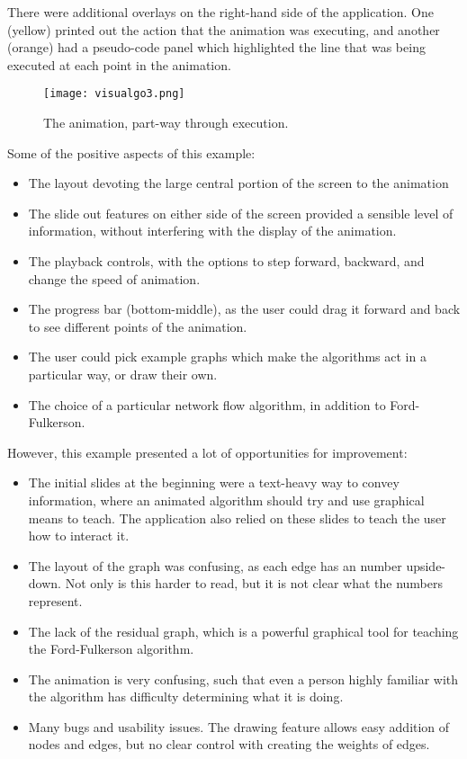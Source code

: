 \documentclass{l4proj}
\begin{document}
There were additional overlays on the right-hand side of the application. One (yellow) printed out the action that the animation was executing, and another (orange) had a pseudo-code panel which highlighted the line that was being executed at each point in the animation.

\begin{figure}[h]
    \centering
    \texttt{[image: visualgo3.png]}
    \caption{The animation, part-way through execution.}
    \label{fig:my_label}
\end{figure}

Some of the positive aspects of this example:
\begin{itemize}[noitemsep]
    \item The layout devoting the large central portion of the screen to the animation
    \item The slide out features on either side of the screen provided a sensible level of information, without interfering with the display of the animation.
    \item The playback controls, with the options to step forward, backward, and change the speed of animation.
    \item The progress bar (bottom-middle), as the user could drag it forward and back to see different points of the animation.
    \item The user could pick example graphs which make the algorithms act in a particular way, or draw their own.
    \item The choice of a particular network flow algorithm, in addition to Ford-Fulkerson.
\end{itemize}

However, this example presented a lot of opportunities for improvement:
\begin{itemize}[noitemsep]
    \item The initial slides at the beginning were a text-heavy way to convey information, where an animated algorithm should try and use graphical means to teach. The application also relied on these slides to teach the user how to interact it.
    \item The layout of the graph was confusing, as each edge has an number upside-down. Not only is this harder to read, but it is not clear what the numbers represent.
    \item The lack of the residual graph, which is a powerful graphical tool for teaching the Ford-Fulkerson algorithm.
    \item The animation is very confusing, such that even a person highly familiar with the algorithm has difficulty determining what it is doing.
    \item Many bugs and usability issues. The drawing feature allows easy addition of nodes and edges, but no clear control with creating the weights of edges.
\end{itemize}
\end{document}

